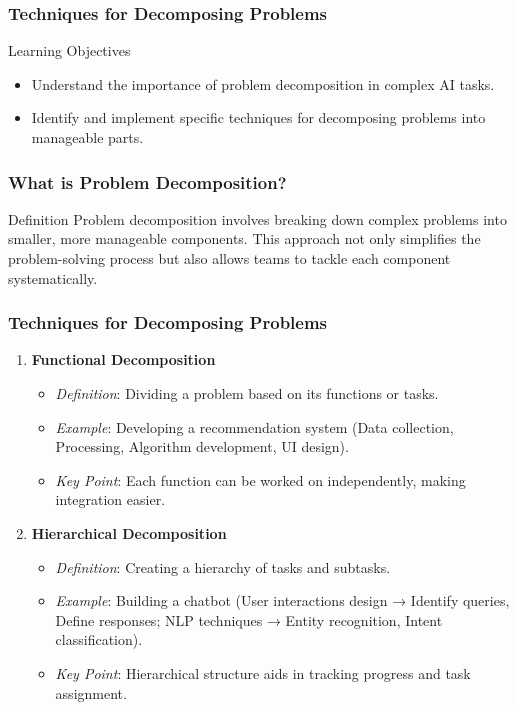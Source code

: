 \documentclass[aspectratio=169]{beamer}
\begin{document}
\begin{frame}[fragile]
    \frametitle{Techniques for Decomposing Problems}
    \begin{block}{Learning Objectives}
        \begin{itemize}
            \item Understand the importance of problem decomposition in complex AI tasks.
            \item Identify and implement specific techniques for decomposing problems into manageable parts.
        \end{itemize}
    \end{block}
\end{frame}

\begin{frame}[fragile]
    \frametitle{What is Problem Decomposition?}
    \begin{block}{Definition}
        Problem decomposition involves breaking down complex problems into smaller, more manageable components. This approach not only simplifies the problem-solving process but also allows teams to tackle each component systematically.
    \end{block}
\end{frame}

\begin{frame}[fragile]
    \frametitle{Techniques for Decomposing Problems}
    \begin{enumerate}
        \item \textbf{Functional Decomposition}
            \begin{itemize}
                \item \textit{Definition}: Dividing a problem based on its functions or tasks.
                \item \textit{Example}: Developing a recommendation system (Data collection, Processing, Algorithm development, UI design).
                \item \textit{Key Point}: Each function can be worked on independently, making integration easier.
            \end{itemize}
        \item \textbf{Hierarchical Decomposition}
            \begin{itemize}
                \item \textit{Definition}: Creating a hierarchy of tasks and subtasks.
                \item \textit{Example}: Building a chatbot (User interactions design → Identify queries, Define responses; NLP techniques → Entity recognition, Intent classification).
                \item \textit{Key Point}: Hierarchical structure aids in tracking progress and task assignment.
            \end{itemize}
    \end{enumerate}
\end{frame}
\end{document}
